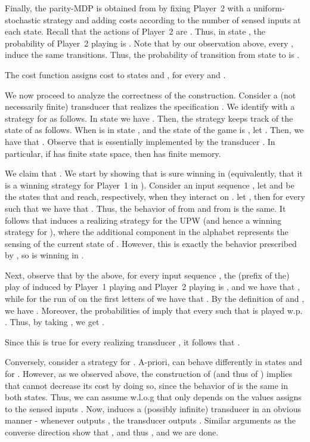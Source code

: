 \documentclass[runningheads,a4paper]{llncs}
\begin{document}
Finally, the parity-MDP  is obtained from  by fixing Player~2 with a uniform-stochastic strategy and adding costs according to the number of sensed inputs at each state. Recall that the actions of Player~2 are . Thus, in state , the probability of Player~2 playing  is . Note that by our observation above, every , induce the same transitions. Thus, the probability of transition from state  to  is .

The cost function assigns cost  to states  and , for every  and .

We now proceed to analyze the correctness of the construction. Consider a (not necessarily finite) transducer  that realizes the specification . We identify with  a strategy  for  as follows. 
In state  we have . Then, the strategy  keeps track of the state of  as follows. When  is in state , and the state of the game is , let . Then, we have that . Observe that  is essentially implemented by the transducer . In particular, if  has finite state space, then  has finite memory.

We claim that . We start by showing that  is sure winning in  (equivalently, that it is a winning strategy for Player~1 in ). Consider an input sequence , let  and  be the states that  and  reach, respectively, when they interact on . let , then for every  such that  we have that . Thus, the behavior of  from  and from  is the same. It follows that  induces a realizing strategy for the UPW  (and hence a winning strategy for ), where the additional  component in the alphabet represents the sensing of the current state of . However, this is exactly the behavior prescribed by , so  is winning in . 

Next, observe that by the above, for every input sequence , the (prefix of the) play of  induced by Player~1 playing  and Player~2 playing  is  , and we have that , while for the run  of  on the first  letters of  we have that . By the definition of  and , we have . Moreover, the probabilities of  imply that every  such that  is played w.p. . Thus, by taking , we get . 

Since this is true for every realizing transducer , it follows that .

Conversely, consider a strategy  for . A-priori,  can behave differently in states  and  for . However, as we observed above, the construction of  (and thus of ) implies that  cannot decrease its cost by doing so, since the behavior of  is the same in both states. Thus, we can assume w.l.o.g that  only depends on the values  assigns to the sensed inputs . Now,  induces a (possibly infinite) transducer  in an obvious manner - whenever  outputs , the transducer outputs . Similar arguments as the converse direction show that , and thus , and we are done.
\end{document}
